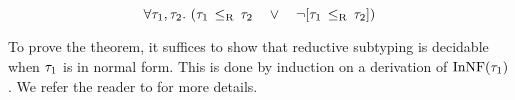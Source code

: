 \begin{theorem}\label{thm:redsub-decidable}
\[
\forall \ty_1, \ty_2.\ 
(\bjsubr{\ty_1}{\ty_2}\quad \lor\quad \lnot [\bjsubr{\ty_1}{\ty_2}])
\]
\end{theorem}

To prove the theorem, 
it suffices to show that reductive subtyping is decidable
when $\tau_1$ is in normal form.
This is done by induction on a derivation of $\mathop{\mathrm{InNF}}(\tau_1)$.
We refer the reader to  for more details.

